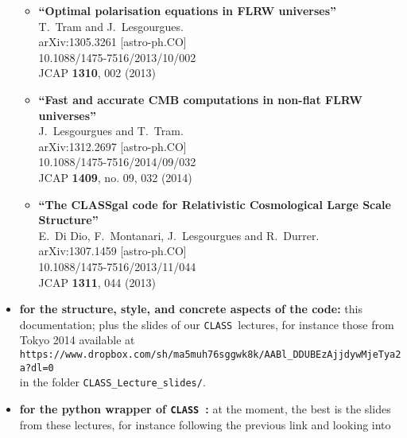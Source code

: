 \documentclass{article}
\newcommand\CLASS{{\tt CLASS}~}
\begin{document}
\begin{itemize}
\begin{itemize}
\item%
{\bf ``Optimal polarisation equations in FLRW universes''}
  \\{}T.~Tram and J.~Lesgourgues.
  \\{}arXiv:1305.3261 [astro-ph.CO]
  \\{}10.1088/1475-7516/2013/10/002
  \\{}JCAP {\bf 1310}, 002 (2013)

\item%
{\bf ``Fast and accurate CMB computations in non-flat FLRW universes''}
  \\{}J.~Lesgourgues and T.~Tram.
  \\{}arXiv:1312.2697 [astro-ph.CO]
  \\{}10.1088/1475-7516/2014/09/032
  \\{}JCAP {\bf 1409}, no. 09, 032 (2014)

\item%
{\bf ``The CLASSgal code for Relativistic Cosmological Large Scale Structure''}
  \\{}E.~Di Dio, F.~Montanari, J.~Lesgourgues and R.~Durrer.
  \\{}arXiv:1307.1459 [astro-ph.CO]
  \\{}10.1088/1475-7516/2013/11/044
  \\{}JCAP {\bf 1311}, 044 (2013)
\end{itemize}

\item {\bf for the structure, style, and concrete aspects of the code:} this documentation; plus the slides of our \CLASS lectures, for instance those from Tokyo 2014 available at \\

{\tt https://www.dropbox.com/sh/ma5muh76sggwk8k/AABl\_DDUBEzAjjdywMjeTya2a?dl=0}\\

in the folder {\tt CLASS\_Lecture\_slides/}.

\item {\bf for the python wrapper of \CLASS:} at the moment, the best is the slides from these lectures, for instance following the previous link and looking into\\


\end{itemize}
\end{document}
